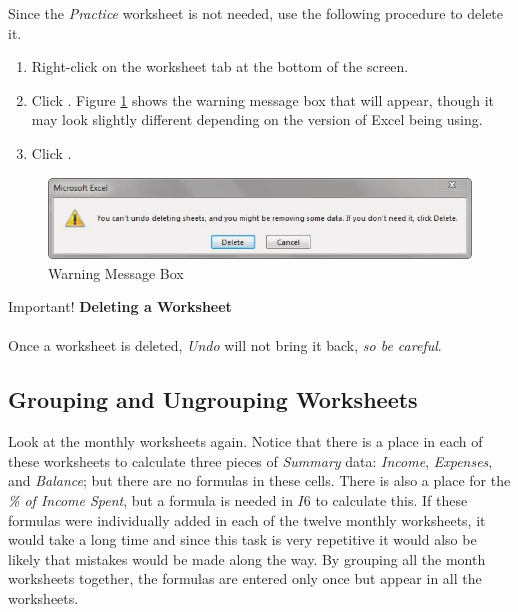 Since the \textit{Practice} worksheet is not needed, use the following procedure to delete it.

\begin{enumerate}
	\item Right-click on the  worksheet tab at the bottom of the screen.
	\item Click . Figure \ref{06:fig03} shows the warning message box that will appear, though it may look slightly different depending on the version of Excel being using. 
	\item Click .
\end{enumerate}

\begin{figure}[H]
	\centering
	\includegraphics[width=\maxwidth{.95\linewidth}]{gfx/ch06_fig03}
	\caption{Warning Message Box}
	\label{06:fig03}
\end{figure}

\begin{center}
	\begin{infobox}{Important!}
		\textbf{Deleting a Worksheet}
		\\
		\\
		Once a worksheet is deleted, \textit{Undo} will not bring it back, \textit{so be careful}.
	\end{infobox}
\end{center}

\subsection{Grouping and Ungrouping Worksheets}

Look at the monthly worksheets again. Notice that there is a place in each of these worksheets to calculate three pieces of \textit{Summary} data: \textit{Income}, \textit{Expenses}, and \textit{Balance}; but there are no formulas in these cells. There is also a place for the \textit{\% of Income Spent}, but a formula is needed in $ I6 $ to calculate this. If these formulas were individually added in each of the twelve monthly worksheets, it would take a long time and since this task is very repetitive it would also be likely that mistakes would be made along the way. By grouping all the month worksheets together, the formulas are entered only once but appear in all the worksheets.

